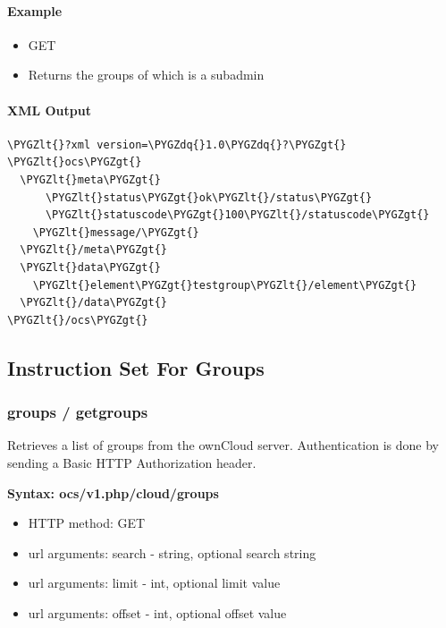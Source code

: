 \documentclass[letterpaper,10pt,english]{sphinxmanual}
\def\PYGZlt{\char`\<}
\def\PYGZgt{\char`\>}
\def\PYGZdq{\char`\"}
\begin{document}
\paragraph{Example}
\label{configuration_user/user_provisioning_api:id18}\begin{itemize}
\item {} 
GET

\item {} 
Returns the groups of which  is a subadmin

\end{itemize}


\paragraph{XML Output}
\label{configuration_user/user_provisioning_api:id19}
\begin{Verbatim}[commandchars=\\\{\}]
\PYGZlt{}?xml version=\PYGZdq{}1.0\PYGZdq{}?\PYGZgt{}
\PYGZlt{}ocs\PYGZgt{}
  \PYGZlt{}meta\PYGZgt{}
      \PYGZlt{}status\PYGZgt{}ok\PYGZlt{}/status\PYGZgt{}
      \PYGZlt{}statuscode\PYGZgt{}100\PYGZlt{}/statuscode\PYGZgt{}
    \PYGZlt{}message/\PYGZgt{}
  \PYGZlt{}/meta\PYGZgt{}
  \PYGZlt{}data\PYGZgt{}
    \PYGZlt{}element\PYGZgt{}testgroup\PYGZlt{}/element\PYGZgt{}
  \PYGZlt{}/data\PYGZgt{}
\PYGZlt{}/ocs\PYGZgt{}
\end{Verbatim}


\subsection{Instruction Set For Groups}
\label{configuration_user/user_provisioning_api:instruction-set-for-groups}

\subsubsection{\textbf{groups / getgroups}}
\label{configuration_user/user_provisioning_api:groups-getgroups}
Retrieves a list of groups from the ownCloud server. Authentication is done by
sending a Basic HTTP Authorization header.

\textbf{Syntax: ocs/v1.php/cloud/groups}
\begin{itemize}
\item {} 
HTTP method: GET

\item {} 
url arguments: search - string, optional search string

\item {} 
url arguments: limit - int, optional limit value

\item {} 
url arguments: offset - int, optional offset value

\end{itemize}
\end{document}
